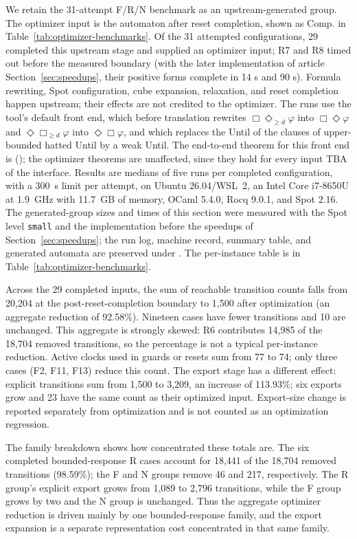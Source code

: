 We retain the 31-attempt F/R/N benchmark as an upstream-generated
group. The optimizer input is the automaton after reset completion, shown as
Comp. in Table~\ref{tab:optimizer-benchmarks}. Of the 31 attempted
configurations, 29 completed this upstream stage and supplied an optimizer
input; R7 and R8 timed out before the measured boundary (with the later
implementation of article Section~\ref{sec:speedups}, their positive forms complete in
14 s and 90 s). Formula rewriting, Spot
configuration, cube expansion, relaxation, and reset completion happen
upstream; their effects are not credited to the optimizer. The runs use the
tool's default front end, which before translation rewrites
$\Box\Diamond_{\ge d}\varphi$ into $\Box\Diamond\varphi$ and
$\Diamond\Box_{\ge d}\varphi$ into $\Diamond\Box\varphi$, and which replaces
the Until of the clauses of upper-bounded hatted Until by a weak Until. The
end-to-end theorem for this front end is
(); the optimizer theorems are unaffected, since
they hold for every input TBA of the interface. Results
are medians of five runs per completed configuration, with a 300~s limit per
attempt, on Ubuntu 26.04/WSL~2, an Intel Core i7-8650U at 1.9~GHz with
11.7~GB of memory, OCaml 5.4.0, Rocq 9.0.1, and Spot 2.16. The generated-group
sizes and times of this section were measured with the Spot level \texttt{small} and
the implementation before the speedups of Section~\ref{sec:speedups}; the run log, machine record, summary
table, and generated automata are preserved under
.
The per-instance table is in Table~\ref{tab:optimizer-benchmarks}.

Across the 29 completed inputs, the sum of reachable transition counts falls
from 20,204 at the post-reset-completion boundary to 1,500 after optimization
(an aggregate reduction of 92.58\%). Nineteen cases have fewer transitions
and 10 are unchanged. This aggregate is strongly skewed: R6 contributes
14,985 of the 18,704 removed transitions, so the percentage is not a typical
per-instance reduction. Active clocks used in guards or resets sum from 77
to 74; only three cases (F2, F11, F13) reduce this count. The export stage has a different
effect: explicit transitions sum from 1,500 to 3,209, an increase of
113.93\%; six exports grow and 23 have the same count as their optimized
input. Export-size change is reported separately from optimization and is
not counted as an optimization regression.

The family breakdown shows how concentrated these totals are. The six
completed bounded-response R cases account for 18,441 of the 18,704 removed
transitions (98.59\%); the F and N groups remove 46 and 217, respectively.
The R group's explicit export grows from 1,089 to 2,796 transitions, while
the F group grows by two and the N group is unchanged. Thus the aggregate
optimizer reduction is driven mainly by one bounded-response family, and the
export expansion is a separate representation cost concentrated in that same
family.

